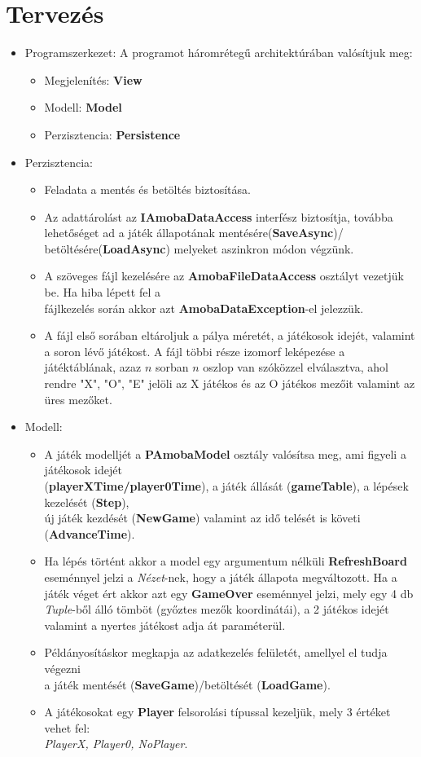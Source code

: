 \documentclass[11pt,a4paper]{article}
\begin{document}
\section{Tervezés}
\begin{itemize}
	\item Programszerkezet: A programot háromrétegű architektúrában valósítjuk meg:
	\begin{itemize}
		\item Megjelenítés: \textbf{View}
		\item Modell: \textbf{Model}
		\item Perzisztencia: \textbf{Persistence}
	\end{itemize}
	\item Perzisztencia:
	\begin{itemize}
		\item Feladata a mentés és betöltés biztosítása.
		\item Az adattárolást az \textbf{IAmobaDataAccess} interfész biztosítja, továbba
		lehetőséget ad a játék állapotának mentésére(\textbf{SaveAsync})/
		betöltésére(\textbf{LoadAsync})	melyeket aszinkron módon végzünk.
		\item A szöveges fájl kezelésére az \textbf{AmobaFileDataAccess} osztályt vezetjük be.
		Ha hiba lépett fel a\\fájlkezelés során akkor azt \textbf{AmobaDataException}-el jelezzük.
		\item A fájl első sorában eltároljuk a pálya méretét, a játékosok idejét, valamint
		a soron lévő játékost. A fájl többi része izomorf leképezése a játéktáblának, azaz
		$n$ sorban $n$ oszlop van szóközzel elválasztva, ahol rendre "X", "O", "E" jelöli
		az X játékos és az O játékos mezőit valamint az üres mezőket.
	\end{itemize}
	\item Modell:
	\begin{itemize}
		\item A játék modelljét a \textbf{PAmobaModel} osztály valósítsa meg, ami figyeli
		a játékosok idejét\\(\textbf{playerXTime/player0Time}), a játék állását (\textbf{gameTable}),
		a lépések kezelését (\textbf{Step}),\\új játék kezdését (\textbf{NewGame})
		valamint az idő telését is követi (\textbf{AdvanceTime}).
		\item Ha lépés történt akkor a model egy argumentum nélküli \textbf{RefreshBoard}
		eseménnyel jelzi a \textit{Nézet}-nek, hogy a játék állapota megváltozott.
		Ha a játék véget ért akkor azt egy \textbf{GameOver} eseménnyel jelzi, mely egy
		4 db \textit{Tuple}-ből álló tömböt (győztes mezők koordinátái), a 2 játékos
		idejét valamint a nyertes játékost adja át paraméterül.
		\item Példányosításkor megkapja az adatkezelés felületét, amellyel el tudja végezni
		\\ a játék mentését (\textbf{SaveGame})/betöltését (\textbf{LoadGame}).
		\item A játékosokat egy \textbf{Player} felsorolási típussal kezeljük, mely
		3 értéket vehet fel:\\ \textit{PlayerX, Player0, NoPlayer}.
	\end{itemize}
\end{itemize}
\end{document}
